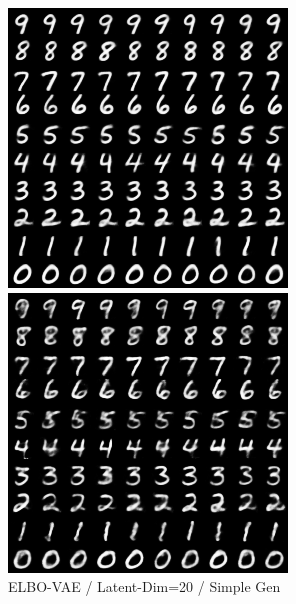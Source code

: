 \documentclass{article}
\begin{document}
\begin{figure}[htb]
  \includegraphics[width=\linewidth]{assets/elbo_20_simple.png}
  \caption{ELBO-VAE / Latent-Dim=20 / Simple Gen}\label{fig:elbo_20_simple}
\endminipage\hfill
{}
   \includegraphics[width=\linewidth]{assets/mmd_20_simple.png}

\end{figure}
\end{document}
